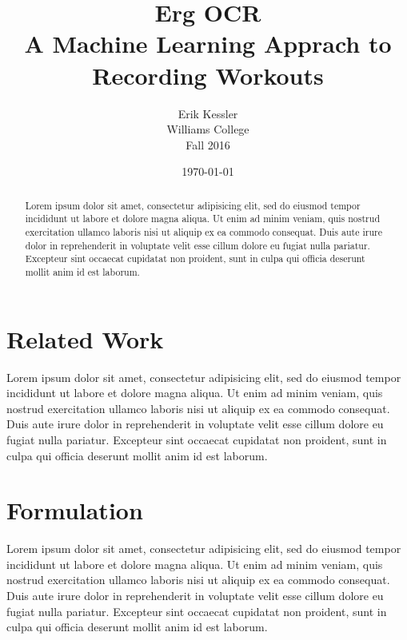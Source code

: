 \documentclass[a4paper,12pt]{article}
\newcommand{\projecttitle}{Erg OCR}
\begin{document}
\thispagestyle{plain}
\pagestyle{fancy}
\clearpage
\setlength{\headsep}{0.4in}


\title{Erg OCR\\ \large A Machine Learning Apprach to Recording Workouts}
\date{\today}
\author{
  {\rm Erik Kessler}\\
  Williams College\\
  Fall 2016
}

\maketitle

\chead{\projecttitle}
\cfoot{\thepage}

\begin{abstract}
Lorem ipsum dolor sit amet, consectetur adipisicing elit, sed do eiusmod tempor incididunt ut labore et dolore magna aliqua. Ut enim ad minim veniam, quis nostrud exercitation ullamco laboris nisi ut aliquip ex ea commodo consequat. Duis aute irure dolor in reprehenderit in voluptate velit esse cillum dolore eu fugiat nulla pariatur. Excepteur sint occaecat cupidatat non proident, sunt in culpa qui officia deserunt mollit anim id est laborum.
\end{abstract}

\section{Related Work}
Lorem ipsum dolor sit amet, consectetur adipisicing elit, sed do eiusmod tempor incididunt ut labore et dolore magna aliqua. Ut enim ad minim veniam, quis nostrud exercitation ullamco laboris nisi ut aliquip ex ea commodo consequat. Duis aute irure dolor in reprehenderit in voluptate velit esse cillum dolore eu fugiat nulla pariatur. Excepteur sint occaecat cupidatat non proident, sunt in culpa qui officia deserunt mollit anim id est laborum.

\section{Formulation}
Lorem ipsum dolor sit amet, consectetur adipisicing elit, sed do eiusmod tempor incididunt ut labore et dolore magna aliqua. Ut enim ad minim veniam, quis nostrud exercitation ullamco laboris nisi ut aliquip ex ea commodo consequat. Duis aute irure dolor in reprehenderit in voluptate velit esse cillum dolore eu fugiat nulla pariatur. Excepteur sint occaecat cupidatat non proident, sunt in culpa qui officia deserunt mollit anim id est laborum.
\end{document}
